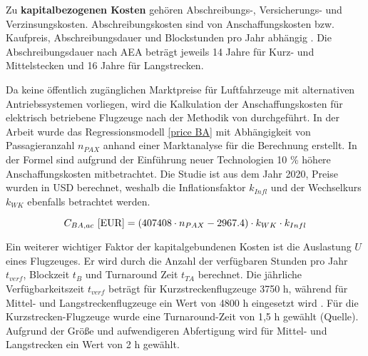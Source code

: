 
Zu \textbf{kapitalbezogenen Kosten} gehören Abschreibungs-, Versicherungs- und Verzinsungskosten. 
Abschreibungskosten sind von Anschaffungskosten bzw. Kaufpreis, 
Abschreibungsdauer und Blockstunden pro Jahr abhängig \cite{conrady2019luftverkehr}.
Die Abschreibungsdauer nach AEA beträgt jeweils 14 Jahre für 
Kurz- und Mittelstecken und 16 Jahre für Langstrecken.

Da keine öffentlich zugänglichen Marktpreise für Luftfahrzeuge mit alternativen Antriebssystemen vorliegen, 
wird die Kalkulation der Anschaffungskosten für elektrisch betriebene Flugzeuge 
nach der Methodik von \cite{monjon2020conceptual} durchgeführt. 
In der Arbeit wurde das Regressionsmodell \eqref{price BA} mit Abhängigkeit von Passagieranzahl $n_{PAX}$ 
anhand einer Marktanalyse für die Berechnung erstellt. 
%
In der Formel sind aufgrund der Einführung neuer Technologien 10 \% höhere Anschaffungskosten mitbetrachtet. 
Die Studie ist aus dem Jahr 2020, Preise wurden in USD berechnet, 
weshalb die Inflationsfaktor $k_{Infl}$ und der Wechselkurs $k_{WK}$ 
ebenfalls betrachtet werden.

\begin{equation}
   {C_{BA,ac} ~[\text{EUR}]} = (407408 \cdot n_{PAX} - 2967.4) \cdot k_{WK} \cdot {k_{Infl}}\\
   \label{price BA}
\end{equation}

Ein weiterer wichtiger Faktor der kapitalgebundenen Kosten ist die Auslastung $U$ eines Flugzeuges. 
Er wird durch die Anzahl der verfügbaren Stunden pro Jahr $t_{verf}$, 
Blockzeit $t_B$ und Turnaround Zeit $t_{TA}$ berechnet. 
Die jährliche Verfügbarkeitszeit $t_{verf}$ beträgt für Kurzstreckenflugzeuge 3750 h, 
während für Mittel- und Langstreckenflugzeuge ein Wert von 4800 h eingesetzt wird \cite{scholz_design_evaluation_doc}. 
Für die Kurzstrecken-Flugzeuge wurde eine Turnaround-Zeit von 1,5 h gewählt (Quelle).
Aufgrund der Größe und aufwendigeren Abfertigung wird für Mittel- und Langstrecken ein Wert von 2 h gewählt.

